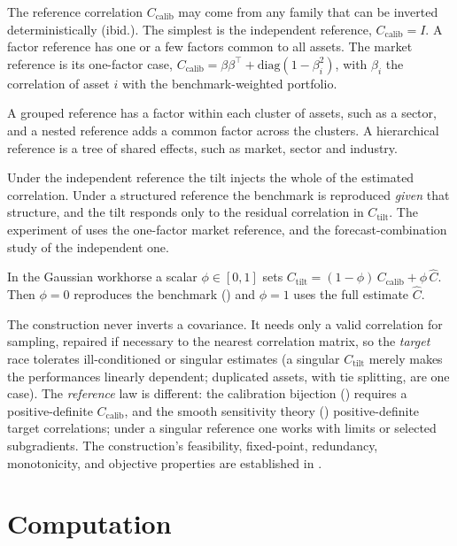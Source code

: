 The reference correlation $C_{\mathrm{calib}}$ may come from any family that can be
inverted deterministically (ibid.).
The simplest is the independent reference,
$C_{\mathrm{calib}} = I$.
A factor reference has one or a few factors common to all
assets.
The market reference is its one-factor case,
$C_{\mathrm{calib}} = \beta\beta^\top + \mathrm{diag}(1-\beta_i^2)$, with $\beta_i$
the correlation of asset $i$ with the benchmark-weighted portfolio.

A grouped
reference has a factor within each cluster of assets, such as a sector, and a
nested reference adds a common factor across the clusters.
A hierarchical
reference is a tree of shared effects, such as market, sector and industry.

Under the independent reference the tilt injects the whole of the estimated
correlation. Under a structured reference the benchmark is reproduced \emph{given}
that structure, and the tilt responds only to the residual correlation in
$C_{\mathrm{tilt}}$. The experiment of  uses the one-factor
market reference, and the forecast-combination study of  the
independent one.

In the Gaussian workhorse a scalar $\phi \in [0,1]$ sets
$C_{\mathrm{tilt}} = (1-\phi)\,C_{\mathrm{calib}} + \phi\,\widehat{C}$. Then
$\phi = 0$ reproduces the benchmark () and $\phi = 1$ uses the
full estimate $\widehat{C}$.

The construction never inverts a covariance. It needs only a valid correlation for
sampling, repaired if necessary to the nearest correlation matrix, so the
\emph{target} race tolerates ill-conditioned or singular estimates (a singular
$C_{\mathrm{tilt}}$ merely makes the performances linearly dependent; duplicated
assets, with tie splitting, are one case). The \emph{reference} law is different: the calibration bijection
() requires a positive-definite $C_{\mathrm{calib}}$, and the smooth
sensitivity theory () positive-definite target correlations; under
a singular reference one works with limits or selected subgradients. The construction's feasibility, fixed-point,
redundancy, monotonicity, and objective properties are established in .

\section{Computation}
\label{sec:computation}


